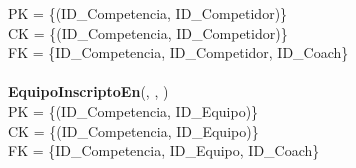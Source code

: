 PK = \{(ID\_Competencia, ID\_Competidor)\}\\
CK = \{(ID\_Competencia, ID\_Competidor)\}\\
FK = \{ID\_Competencia, ID\_Competidor, ID\_Coach\}\\
\\
\textbf{EquipoInscriptoEn}(, , )\\
PK = \{(ID\_Competencia, ID\_Equipo)\}\\
CK = \{(ID\_Competencia, ID\_Equipo)\}\\
FK = \{ID\_Competencia, ID\_Equipo, ID\_Coach\}\\
\\
